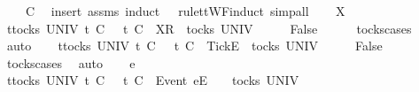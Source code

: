 \begin{isabellebody}
\ \ \ {\isachardoublequoteopen}{\isasymrho}{\isacharprime}\ {\isasymlesssim}\isactrlsub C\ {\isasymrho}{\isachardoublequoteclose}\isanewline
%
\isadelimproof
%
\endisadelimproof
%
\isatagproof
{}\isamarkupfalse%
\ {\isacharparenleft}insert\ assms{\isacharcomma}\ induct\ {\isachardoublequoteopen}{\isasymrho}{\isacharprime}{\isachardoublequoteclose}\ {\isachardoublequoteopen}{\isasymrho}{\isachardoublequoteclose}\ rule{\isacharcolon}ttWF{}{\isachardot}induct{\isacharcomma}\ simp{\isacharunderscore}all{\isacharparenright}\isanewline
\ \ \isamarkupfalse%
\ X\isanewline
\ \ \isamarkupfalse%
\ {\isachardoublequoteopen}{\isasymforall}t{\isasymin}tocks\ UNIV{\isachardot}\ t\ {\isasymle}\isactrlsub C\ {\isasymsigma}\ {\isasymlongrightarrow}\ t\ {\isasymle}\isactrlsub C\ {\isacharbrackleft}{\isacharbrackright}{\isachardoublequoteclose}\ {\isachardoublequoteopen}{\isacharbrackleft}{\isacharbrackleft}X{\isacharbrackright}\isactrlsub R{\isacharbrackright}\ {\isasymin}\ tocks\ UNIV{\isachardoublequoteclose}\isanewline
\ \ \isamarkupfalse%
\ \isamarkupfalse%
\ {\isachardoublequoteopen}False{\isachardoublequoteclose}\isanewline
\ \ \ \ \isamarkupfalse%
\ tocks{\isachardot}cases\ \isamarkupfalse%
\ auto\isanewline
{}\isamarkupfalse%
\isanewline
\ \ \isamarkupfalse%
\ {\isachardoublequoteopen}{\isasymforall}t{\isasymin}tocks\ UNIV{\isachardot}\ t\ {\isasymle}\isactrlsub C\ {\isasymsigma}\ {\isasymlongrightarrow}\ t\ {\isasymle}\isactrlsub C\ {\isacharbrackleft}{\isacharbrackright}{\isachardoublequoteclose}\ {\isachardoublequoteopen}{\isacharbrackleft}{\isacharbrackleft}Tick{\isacharbrackright}\isactrlsub E{\isacharbrackright}\ {\isasymin}\ tocks\ UNIV{\isachardoublequoteclose}\isanewline
\ \ \isamarkupfalse%
\ \isamarkupfalse%
\ {\isachardoublequoteopen}False{\isachardoublequoteclose}\isanewline
\ \ \ \ \isamarkupfalse%
\ tocks{\isachardot}cases\ \isamarkupfalse%
\ auto\isanewline
{}\isamarkupfalse%
\isanewline
\ \ \isamarkupfalse%
\ e\ {\isasymsigma}{\isacharprime}{\isacharprime}\isanewline
\ \ \isamarkupfalse%
\ {\isachardoublequoteopen}{\isasymforall}t{\isasymin}tocks\ UNIV{\isachardot}\ t\ {\isasymle}\isactrlsub C\ {\isasymsigma}\ {\isasymlongrightarrow}\ t\ {\isasymle}\isactrlsub C\ {\isacharbrackleft}{\isacharbrackright}{\isachardoublequoteclose}\ {\isachardoublequoteopen}{\isacharbrackleft}Event\ e{\isacharbrackright}\isactrlsub E\ {\isacharhash}\ {\isasymsigma}{\isacharprime}{\isacharprime}\ {\isasymin}\ tocks\ UNIV{\isachardoublequoteclose}\isanewline

\end{isabellebody}
